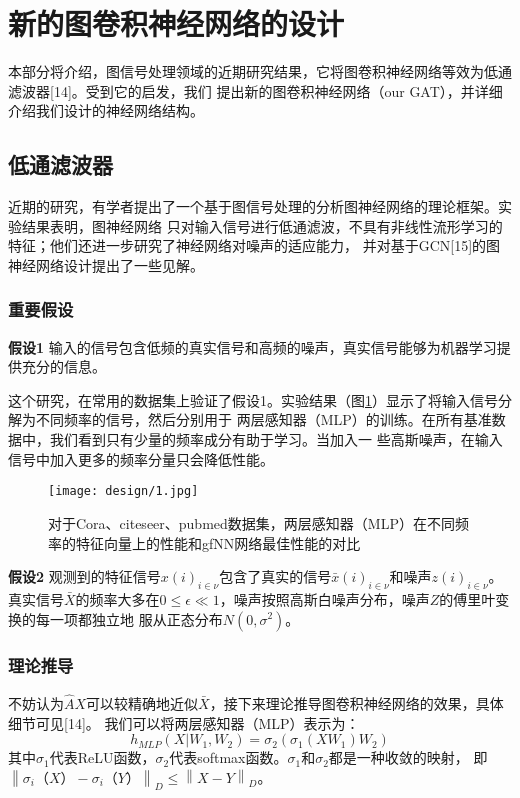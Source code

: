 \cleardoublepage

\section{新的图卷积神经网络的设计}
本部分将介绍，图信号处理领域的近期研究结果，它将图卷积神经网络等效为低通滤波器[14]。受到它的启发，我们
提出新的图卷积神经网络（our GAT），并详细介绍我们设计的神经网络结构。

\subsection{低通滤波器}
近期的研究，有学者提出了一个基于图信号处理的分析图神经网络的理论框架。实验结果表明，图神经网络
只对输入信号进行低通滤波，不具有非线性流形学习的特征；他们还进一步研究了神经网络对噪声的适应能力，
并对基于GCN[15]的图神经网络设计提出了一些见解。
\subsubsection{重要假设}
    \textbf{假设1} \quad 输入的信号包含低频的真实信号和高频的噪声，真实信号能够为机器学习提供充分的信息。
    
    这个研究，在常用的数据集上验证了假设1。实验结果（图\ref{3-1}）显示了将输入信号分解为不同频率的信号，然后分别用于
    两层感知器（MLP）的训练。在所有基准数据中，我们看到只有少量的频率成分有助于学习。当加入一
    些高斯噪声，在输入信号中加入更多的频率分量只会降低性能。
    \begin{figure}[ht]
        \centering
        \captionsetup{width=10cm}
        \texttt{[image: design/1.jpg]}
        \caption{\label{3-1}对于Cora、citeseer、pubmed数据集，两层感知器（MLP）在不同频率的特征向量上的性能和gfNN网络最佳性能的对比}
    \end{figure}
    
    \textbf{假设2} \quad 
    观测到的特征信号${x(i)}_{i \in \nu}$包含了真实的信号${\bar{x}(i)}_{i \in \nu}$和噪声${z(i)}_{i \in \nu}$。
    真实信号$\bar{X}$的频率大多在$ 0 \le \epsilon \ll 1 $，噪声按照高斯白噪声分布，噪声$Z$的傅里叶变换的每一项都独立地
    服从正态分布$ N(0,\sigma^{2} ) $。

\subsubsection{理论推导}
不妨认为$ \hat{A}X $可以较精确地近似$ \bar{X} $，接下来理论推导图卷积神经网络的效果，具体细节可见[14]。
我们可以将两层感知器（MLP）表示为：
$$ h_{MLP}(X|W_1,W_2) = \sigma_{2}(\sigma_{1}(XW_1)W_2) $$
其中$\sigma_{1}$代表ReLU函数，$\sigma_{2}$代表softmax函数。$\sigma_{1}$和$\sigma_{2}$都是一种收敛的映射，
即$  \left \| \sigma_{i}（X）- \sigma_{i}（Y） \right \|_{D}  \le  \left \| X-Y \right \|_{D} $。

